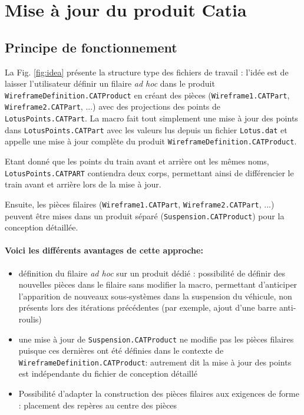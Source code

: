 \section{Mise à jour du produit Catia}
\label{majcatia}

\subsection{Principe de fonctionnement}

\par La Fig. \ref{fig:idea} présente la structure type des fichiers de travail : l'idée est de laisser l'utilisateur définir un filaire \textit{ad hoc} dans le produit \texttt{WireframeDefinition.CATProduct} en créant des pièces (\texttt{Wireframe1.CATPart}, \texttt{Wireframe2.CATPart}, ...) avec des projections des points de \texttt{LotusPoints.CATPart}. La macro fait tout simplement une mise à jour des points dans  \texttt{LotusPoints.CATPart} avec les valeurs lus depuis un fichier \texttt{Lotus.dat} et appelle une mise à jour complète du produit \texttt{WireframeDefinition.CATProduct}. 
\par Etant donné que les points du train avant et arrière ont les mêmes noms, \texttt{LotusPoints.CATPART} contiendra deux corps, permettant ainsi de différencier le train avant et arrière lors de la mise à jour.
\par Ensuite, les pièces filaires (\texttt{Wireframe1.CATPart}, \texttt{Wireframe2.CATPart}, ...) peuvent être mises dans un produit séparé (\texttt{Suspension.CATProduct}) pour la conception détaillée. \\

\paragraph{Voici les différents avantages de cette approche:}

\begin{itemize}
    \item définition du filaire \textit{ad hoc} sur un produit dédié : possibilité de définir des nouvelles pièces dans le filaire sans modifier la macro, permettant d'anticiper l'apparition de nouveaux sous-systèmes dans la suspension du véhicule, non présents lors des itérations précédentes (par exemple, ajout d'une barre anti-roulis)
    \item une mise à jour de \texttt{Suspension.CATProduct} ne modifie pas les pièces filaires puisque ces dernières ont été définies dans le contexte de \texttt{WireframeDefinition.CATProduct}: autrement dit la mise à jour des points est indépendante du fichier de conception détaillé
    \item Possibilité d'adapter la construction des pièces filaires aux exigences de forme : placement des repères au centre des pièces
\end{itemize}{}

